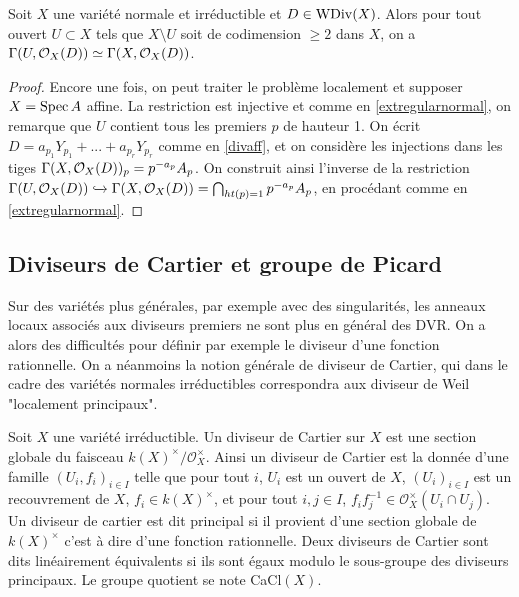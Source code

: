 \begin{prop}\label{isomorphismcodim2}
Soit $X$ une variété normale et irréductible et $D\in\operatorname{WDiv}(X)$. Alors pour tout ouvert $U\subset X$ tels que $X\setminus U$ soit de codimension $\geq 2$ dans $X$, on a $\Gamma(U,\mathcal{O}_X(D))\simeq \Gamma(X,\mathcal{O}_X(D))$.
\end{prop}
\begin{proof}
Encore une fois, on peut traiter le problème localement et supposer $X=\operatorname{Spec} A$ affine. La restriction est injective et comme en \ref{extregularnormal}, on remarque que $U$ contient tous les premiers $p$ de hauteur 1. On écrit $D=a_{p_1}Y_{p_1}+...+a_{p_r}Y_{p_r}$ comme en \ref{divaff}, et on considère les injections dans les tiges $\Gamma(X,\mathcal{O}_X(D))_p=p^{-a_p}A_p$. On construit ainsi l'inverse de la restriction $\Gamma(U, \mathcal{O}_X(D))\xhookrightarrow{}\Gamma(X,\mathcal{O}_X(D))=\bigcap_{ht(p)=1}p^{-a_p}A_p$, en procédant comme en \ref{extregularnormal}.
\end{proof}

\subsection{Diviseurs de Cartier et groupe de Picard}

Sur des variétés plus générales, par exemple avec des singularités, les anneaux locaux associés aux diviseurs premiers ne sont plus en général des DVR. On a alors des difficultés pour définir par exemple le diviseur d'une fonction rationnelle. On a néanmoins la notion générale de diviseur de Cartier, qui dans le cadre des variétés normales irréductibles correspondra aux diviseur de Weil "localement principaux".

\begin{defn}
Soit $X$ une variété irréductible. Un diviseur de Cartier sur $X$ est une section globale du faisceau $k(X)^\times/\mathcal{O}_X^\times$. Ainsi un diviseur de Cartier est la donnée d'une famille $(U_i, f_i)_{i\in I}$ telle que pour tout $i$, $U_i$ est un ouvert de $X$, $(U_i)_{i\in I}$ est un recouvrement de $X$, $f_i\in k(X)^\times$, et pour tout $i,j \in I$, $f_if_j^{-1}\in \mathcal{O}_X^\times(U_i\cap U_j)$.\\
Un diviseur de cartier est dit principal si il provient d'une section globale de $k(X)^\times$ c'est à dire d'une fonction rationnelle. Deux diviseurs de Cartier sont dits linéairement équivalents si ils sont égaux modulo le sous-groupe des diviseurs principaux. Le groupe quotient se note CaCl$(X)$.
\end{defn}





